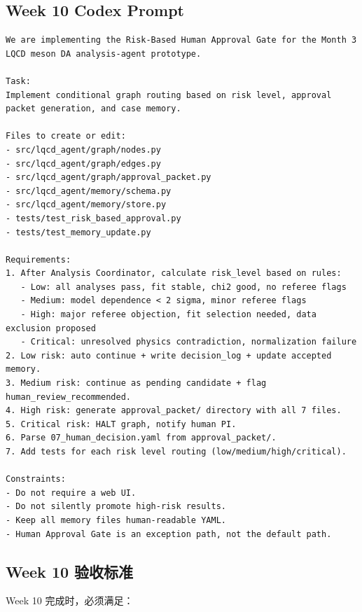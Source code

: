 \documentclass[11pt,a4paper,fontset=none]{ctexart}
\begin{document}
\subsection{Week 10 Codex Prompt}
\begin{lstlisting}
We are implementing the Risk-Based Human Approval Gate for the Month 3 LQCD meson DA analysis-agent prototype.

Task:
Implement conditional graph routing based on risk level, approval packet generation, and case memory.

Files to create or edit:
- src/lqcd_agent/graph/nodes.py
- src/lqcd_agent/graph/edges.py
- src/lqcd_agent/graph/approval_packet.py
- src/lqcd_agent/memory/schema.py
- src/lqcd_agent/memory/store.py
- tests/test_risk_based_approval.py
- tests/test_memory_update.py

Requirements:
1. After Analysis Coordinator, calculate risk_level based on rules:
   - Low: all analyses pass, fit stable, chi2 good, no referee flags
   - Medium: model dependence < 2 sigma, minor referee flags
   - High: major referee objection, fit selection needed, data exclusion proposed
   - Critical: unresolved physics contradiction, normalization failure
2. Low risk: auto continue + write decision_log + update accepted memory.
3. Medium risk: continue as pending candidate + flag human_review_recommended.
4. High risk: generate approval_packet/ directory with all 7 files.
5. Critical risk: HALT graph, notify human PI.
6. Parse 07_human_decision.yaml from approval_packet/.
7. Add tests for each risk level routing (low/medium/high/critical).

Constraints:
- Do not require a web UI.
- Do not silently promote high-risk results.
- Keep all memory files human-readable YAML.
- Human Approval Gate is an exception path, not the default path.
\end{lstlisting}

\subsection{Week 10 验收标准}

Week 10 完成时，必须满足：
\end{document}
